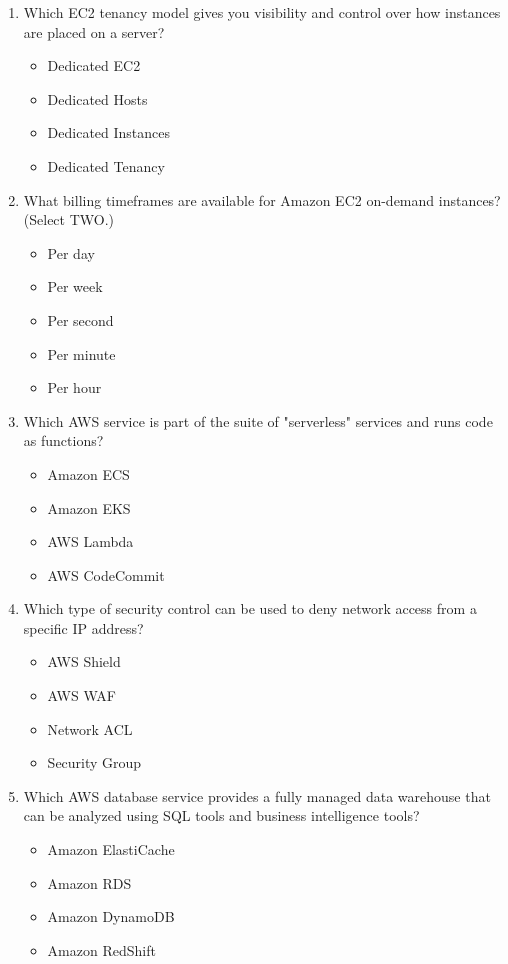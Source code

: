 \begin{enumerate}
	\item Which EC2 tenancy model gives you visibility and control over how instances are placed on a server?
	\begin{itemize}
		\item Dedicated EC2
		\item Dedicated Hosts
		\item Dedicated Instances
		\item Dedicated Tenancy
	\end{itemize}

	\item What billing timeframes are available for Amazon EC2 on-demand instances? (Select TWO.)
	\begin{itemize}
		\item Per day
		\item Per week
		\item Per second
		\item Per minute
		\item Per hour
	\end{itemize}

	\item Which AWS service is part of the suite of "serverless" services and runs code as functions?
	\begin{itemize}
		\item Amazon ECS
		\item Amazon EKS
		\item AWS Lambda
		\item AWS CodeCommit
	\end{itemize}

	\item Which type of security control can be used to deny network access from a specific IP address?
	\begin{itemize}
		\item AWS Shield
		\item AWS WAF
		\item Network ACL
		\item Security Group
	\end{itemize}

	\item Which AWS database service provides a fully managed data warehouse that can be analyzed using SQL tools and business intelligence tools?
	\begin{itemize}
		\item Amazon ElastiCache
		\item Amazon RDS
		\item Amazon DynamoDB
		\item Amazon RedShift
	\end{itemize}


\end{enumerate}
